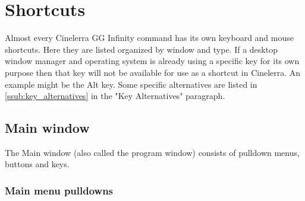 \chapter{Shortcuts}%
\label{cha:shortcuts}

Almost every Cinelerra GG Infinity command has its own keyboard and mouse shortcuts. Here
they are listed organized by window and type.  If a desktop window manager and operating
system is already using a specific key for its own purpose then that key will not be available
for use as a shortcut in Cinelerra. An example might be the Alt key. Some specific alternatives
are listed in \ref{ssub:key_alternatives} in the "Key Alternatives" paragraph.

\section{Main window }%
\label{sec:main_window}

The Main window (also called the program window) consists of pulldown menus, buttons and keys.

\subsection*{Main menu pulldowns}%
\label{sub:main_menu_pulldowns}

\renewcommand{\arraystretch}{1.15}%

